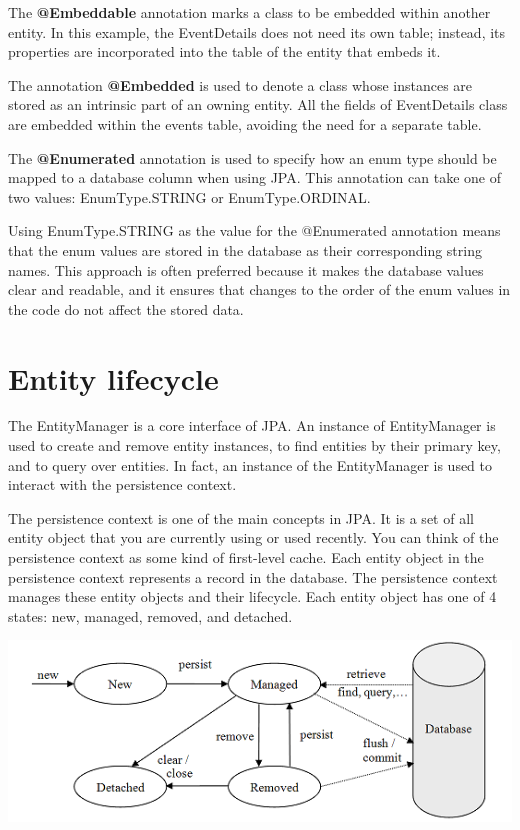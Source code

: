 The \textbf{@Embeddable} annotation marks a class to be embedded within another entity.
In this example,  the EventDetails does not need its own table; instead, its properties are incorporated into the table of the entity that embeds it.

The annotation \textbf{@Embedded}  is used to denote a class whose instances are stored as an intrinsic part of an owning entity.
 All the fields of EventDetails class are embedded within the events table, avoiding the need for a separate table.

The \textbf{@Enumerated} annotation is used to specify how an enum type should be mapped to a database column when using JPA. This annotation can take one of two values: EnumType.STRING or EnumType.ORDINAL.

Using EnumType.STRING as the value for the @Enumerated annotation means that the enum values are stored in the database as their corresponding string names. This approach is often preferred because it makes the database values clear and readable, and it ensures that changes to the order of the enum values in the code do not affect the stored data.

\section{Entity lifecycle}

The EntityManager is a core interface of JPA.  An instance of EntityManager is used to create and remove  entity instances, to find entities by their primary key,  and to query over entities.  In fact,  an instance of the EntityManager is used to interact with the persistence context. 

The persistence context is one of the main concepts in JPA.
It is a set of all entity object that you are currently using or used recently. You can think of the persistence context as some kind of first-level cache. Each entity object in the persistence context represents a record in the database.
The persistence context manages these entity objects and their lifecycle. Each entity object has one of 4 states: new, managed, removed, and detached.

\includegraphics[width=\textwidth]{./images/jpa/entity_states}

